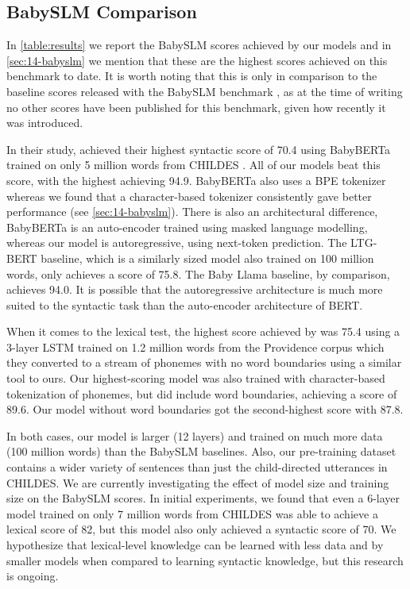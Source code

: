 \subsection{BabySLM Comparison}
\label{sec:14-babyslmcomparison}

In \cref{table:results} we report the BabySLM scores achieved by our models and in \cref{sec:14-babyslm} we mention that these are the highest scores achieved on this benchmark to date. It is worth noting that this is only in comparison to the baseline scores released with the BabySLM benchmark \citep{lavechin}, as at the time of writing no other scores have been published for this benchmark, given how recently it was introduced.

In their study, \citet{lavechin} achieved their highest syntactic score of 70.4 using BabyBERTa \citep{huebner-etal-2021-babyberta} trained on only 5 million words from CHILDES \citep{macwhinney1985child}. All of our models beat this score, with the highest achieving 94.9. BabyBERTa also uses a BPE tokenizer whereas we found that a character-based tokenizer consistently gave better performance (see \cref{sec:14-babyslm}). There is also an architectural difference, BabyBERTa is an auto-encoder trained using masked language modelling, whereas our model is autoregressive, using next-token prediction. The LTG-BERT baseline, which is a similarly sized model also trained on 100 million words, only achieves a score of 75.8. The Baby Llama baseline, by comparison, achieves 94.0. It is possible that the autoregressive architecture is much more suited to the syntactic task than the auto-encoder architecture of BERT. 

When it comes to the lexical test, the highest score achieved by \citet{lavechin} was 75.4 using a 3-layer LSTM trained on 1.2 million words from the Providence corpus \citep{borschinger-etal-2013-joint} which they converted to a stream of phonemes with no word boundaries using a similar tool to ours. Our highest-scoring model was also trained with character-based tokenization of phonemes, but did include word boundaries, achieving a score of 89.6. Our model without word boundaries got the second-highest score with 87.8.

In both cases, our model is larger (12 layers) and trained on much more data (100 million words) than the BabySLM baselines. Also, our pre-training dataset contains a wider variety of sentences than just the child-directed utterances in CHILDES. We are currently investigating the effect of model size and training size on the BabySLM scores. In initial experiments, we found that even a 6-layer model trained on only 7 million words from CHILDES was able to achieve a lexical score of 82, but this model also only achieved a syntactic score of 70. We hypothesize that lexical-level knowledge can be learned with less data and by smaller models when compared to learning syntactic knowledge, but this research is ongoing.

